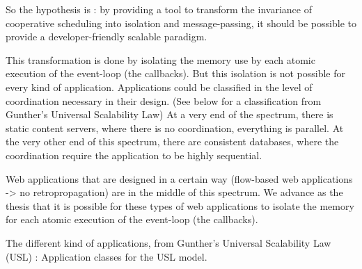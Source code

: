 
So the hypothesis is : by providing a tool to transform the invariance of cooperative scheduling into isolation and message-passing, it should be possible to provide a developer-friendly scalable paradigm.

This transformation is done by isolating the memory use by each atomic execution of the event-loop (the callbacks).
But this isolation is not possible for every kind of application.
Applications could be classified in the level of coordination necessary in their design. (See below for a classification from Gunther's Universal Scalability Law)
At a very end of the spectrum, there is static content servers, where there is no coordination, everything is parallel.
At the very other end of this spectrum, there are consistent databases, where the coordination require the application to be highly sequential.

Web applications that are designed in a certain way (flow-based web applications -> no retropropagation) are in the middle of this spectrum.
We advance as the thesis that it is possible for these types of web applications to isolate the memory for each atomic execution of the event-loop (the callbacks).



The different kind of applications, from Gunther's Universal Scalability Law (USL) :
Application classes for the USL model.

